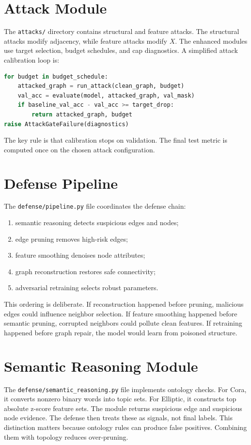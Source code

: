 \documentclass[12pt,oneside]{report}
\begin{document}
\section{Attack Module}
The \texttt{attacks/} directory contains structural and feature attacks. The structural attacks modify adjacency, while feature attacks modify $X$. The enhanced modules use target selection, budget schedules, and cap diagnostics. A simplified attack calibration loop is:
\begin{lstlisting}[language=Python]
for budget in budget_schedule:
    attacked_graph = run_attack(clean_graph, budget)
    val_acc = evaluate(model, attacked_graph, val_mask)
    if baseline_val_acc - val_acc >= target_drop:
        return attacked_graph, budget
raise AttackGateFailure(diagnostics)
\end{lstlisting}
The key rule is that calibration stops on validation. The final test metric is computed once on the chosen attack configuration.

\section{Defense Pipeline}
The \texttt{defense/pipeline.py} file coordinates the defense chain:
\begin{enumerate}
    \item semantic reasoning detects suspicious edges and nodes;
    \item edge pruning removes high-risk edges;
    \item feature smoothing denoises node attributes;
    \item graph reconstruction restores safe connectivity;
    \item adversarial retraining selects robust parameters.
\end{enumerate}
This ordering is deliberate. If reconstruction happened before pruning, malicious edges could influence neighbor selection. If feature smoothing happened before semantic pruning, corrupted neighbors could pollute clean features. If retraining happened before graph repair, the model would learn from poisoned structure.

\section{Semantic Reasoning Module}
The \texttt{defense/semantic\_reasoning.py} file implements ontology checks. For Cora, it converts nonzero binary words into topic sets. For Elliptic, it constructs top absolute z-score feature sets. The module returns suspicious edge and suspicious node evidence. The defense then treats these as signals, not final labels. This distinction matters because ontology rules can produce false positives. Combining them with topology reduces over-pruning.
\end{document}
